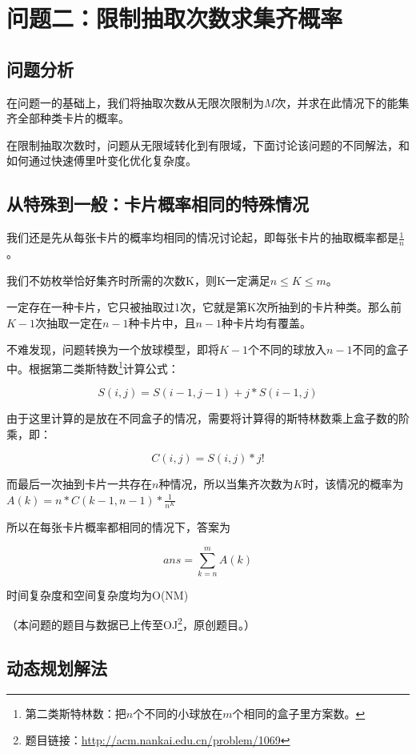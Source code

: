\documentclass[master]{thesis-uestc}
\begin{document}
\chapter{问题二：限制抽取次数求集齐概率}

\section{问题分析}

在问题一的基础上，我们将抽取次数从无限次限制为$M$次，并求在此情况下的能集齐全部种类卡片的概率。

在限制抽取次数时，问题从无限域转化到有限域，下面讨论该问题的不同解法，和如何通过快速傅里叶变化优化复杂度。

\section{从特殊到一般：卡片概率相同的特殊情况}

我们还是先从每张卡片的概率均相同的情况讨论起，即每张卡片的抽取概率都是$\frac{1}{n}$。

我们不妨枚举恰好集齐时所需的次数K，则K一定满足$n\leq K\leq m$。

一定存在一种卡片，它只被抽取过1次，它就是第K次所抽到的卡片种类。那么前$K-1$次抽取一定在$n-1$种卡片中，且$n-1$种卡片均有覆盖。

不难发现，问题转换为一个放球模型，即将$K-1$个不同的球放入$n-1$不同的盒子中。根据第二类斯特数\footnote{第二类斯特林数：把$n$个不同的小球放在$m$个相同的盒子里方案数。}计算公式： 

$$
S(i,j)=S(i-1,j-1)+j*S(i-1,j)
$$

由于这里计算的是放在不同盒子的情况，需要将计算得的斯特林数乘上盒子数的阶乘，即：

$$
C(i,j)=S(i,j)*j!
$$

而最后一次抽到卡片一共存在$n$种情况，所以当集齐次数为$K$时，该情况的概率为$A(k)=n*C(k-1,n-1)*{\frac{1}{n^K}}$

所以在每张卡片概率都相同的情况下，答案为

$$
ans=\sum\limits_{k=n}^m{A(k)}
$$

时间复杂度和空间复杂度均为O(NM)

（本问题的题目与数据已上传至OJ\footnote{题目链接：\url{http://acm.nankai.edu.cn/problem/1069} }，原创题目。）

\section{动态规划解法}
\end{document}
